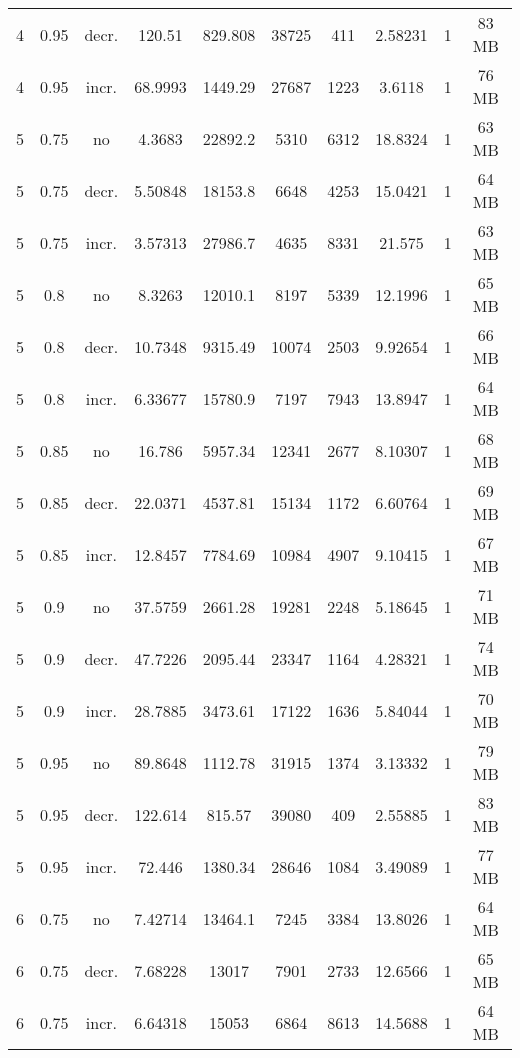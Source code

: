 \begin{longtable}{c|c|c|c|c|c|c|c|c|c}
  4  &  0.95  & decr. & 120.51   &  829.808 &  38725  &  411   &  2.58231  &  1  & 83  MB \\
  4  &  0.95  & incr. & 68.9993  &  1449.29 &  27687  &  1223  &  3.6118   &  1  & 76  MB \\
  \hline
  5  &  0.75  & no    & 4.3683   &  22892.2 &  5310   &  6312  &  18.8324  &  1  & 63  MB \\
  5  &  0.75  & decr. & 5.50848  &  18153.8 &  6648   &  4253  &  15.0421  &  1  & 64  MB \\
  5  &  0.75  & incr. & 3.57313  &  27986.7 &  4635   &  8331  &  21.575   &  1  & 63  MB \\
  \hline
  5  &  0.8   & no    & 8.3263   &  12010.1 &  8197   &  5339  &  12.1996  &  1  & 65  MB \\
  5  &  0.8   & decr. & 10.7348  &  9315.49 &  10074  &  2503  &  9.92654  &  1  & 66  MB \\
  5  &  0.8   & incr. & 6.33677  &  15780.9 &  7197   &  7943  &  13.8947  &  1  & 64  MB \\
  \hline
  5  &  0.85  & no    & 16.786   &  5957.34 &  12341  &  2677  &  8.10307  &  1  & 68  MB \\
  5  &  0.85  & decr. & 22.0371  &  4537.81 &  15134  &  1172  &  6.60764  &  1  & 69  MB \\
  5  &  0.85  & incr. & 12.8457  &  7784.69 &  10984  &  4907  &  9.10415  &  1  & 67  MB \\
  \hline
  5  &  0.9   & no    & 37.5759  &  2661.28 &  19281  &  2248  &  5.18645  &  1  & 71  MB \\
  5  &  0.9   & decr. & 47.7226  &  2095.44 &  23347  &  1164  &  4.28321  &  1  & 74  MB \\
  5  &  0.9   & incr. & 28.7885  &  3473.61 &  17122  &  1636  &  5.84044  &  1  & 70  MB \\
  \hline
  5  &  0.95  & no    & 89.8648  &  1112.78 &  31915  &  1374  &  3.13332  &  1  & 79  MB \\
  5  &  0.95  & decr. & 122.614  &  815.57  &  39080  &  409   &  2.55885  &  1  & 83  MB \\
  5  &  0.95  & incr. & 72.446   &  1380.34 &  28646  &  1084  &  3.49089  &  1  & 77  MB \\
  \hline
  6  &  0.75  & no    & 7.42714  &  13464.1 &  7245   &  3384  &  13.8026  &  1  & 64  MB \\
  6  &  0.75  & decr. & 7.68228  &  13017   &  7901   &  2733  &  12.6566  &  1  & 65  MB \\
  6  &  0.75  & incr. & 6.64318  &  15053   &  6864   &  8613  &  14.5688  &  1  & 64  MB \\

\end{longtable}

